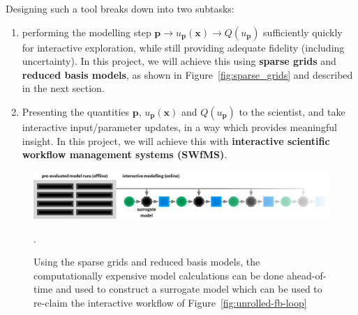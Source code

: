 \documentclass[a4paper,fontsize=12pt]{scrartcl}
\begin{document}
Designing such a tool breaks down into two subtasks:
\begin{enumerate}
\item performing the modelling step
  $\mathbf{p} \rightarrow u_{\mathbf{p}}(\mathbf{x}) \rightarrow
  Q(u_{\mathbf{p}})$ sufficiently quickly for interactive exploration,
  while still providing adequate fidelity (including uncertainty). In
  this project, we will achieve this using \textbf{sparse grids} 
  and \textbf{reduced basis models}, as
  shown in Figure~\ref{fig:sparse_grids} and described in the next
  section.
\item Presenting the quantities $\mathbf{p}$,
  $u_{\mathbf{p}}(\mathbf{x})$ and $Q(u_{\mathbf{p}})$ to the
  scientist, and take interactive input/parameter updates, in a way
  which provides meaningful insight. In this project, we will achieve
  this with \textbf{interactive scientific workflow management systems
    (SWfMS)}.
\end{enumerate}
\begin{figure}
  \centering
  \includegraphics[width=\textwidth]{figures/sg-surrogate-model-fb-loop.pdf}
  \caption{Using the sparse grids and reduced basis models, the computationally
    expensive model calculations can be done ahead-of-time and used to
    construct a surrogate model which can be used to re-claim the
    interactive workflow of Figure~\ref{fig:unrolled-fb-loop}}.
  \label{fig:sg-surrogate-model-fb-loop}
\end{figure}









\end{document}
